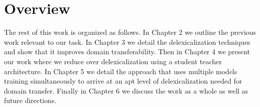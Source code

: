 \section{Overview}
The rest of this work is organized as follows. In Chapter 2 we outline the previous work relevant to our task. In Chapter 3 we detail the delexicalization techniques and show that it improves domain transferability. Then in Chapter 4 we present our work where we reduce over delexicalization using a student teacher architecture. In Chapter 5 we detail the approach that uses multiple models training simultaneously to arrive at an apt level of delexicalization needed for domain transfer. Finally in Chapter 6 we discuss the work as a whole as well as future directions. 
